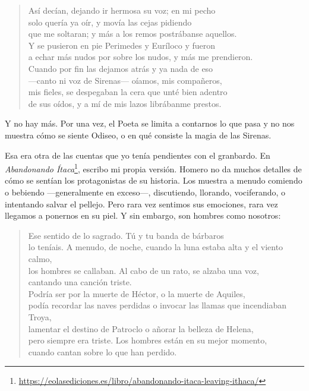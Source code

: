 \begin{verse}
Así decían, dejando ir hermosa su voz; en mi pecho\\
solo quería ya oír, y movía las cejas pidiendo\\
que me soltaran; y más a los remos postrábanse aquellos.\\
Y se pusieron en pie Perimedes y Euríloco y fueron\\
a echar más nudos por sobre los nudos, y más me prendieron.\\
Cuando por fin las dejamos atrás y ya nada de eso\\
---canto ni voz de Sirenas--- oíamos, mis compañeros,\\
mis fieles, se despegaban la cera que unté bien adentro\\
de sus oídos, y a mí de mis lazos librábanme prestos.
\end{verse}

Y no hay más. Por una vez, el Poeta se limita a contarnos lo que pasa y no nos muestra cómo se siente Odiseo, o en qué consiste la magia de las Sirenas.

Esa era otra de las cuentas que yo tenía pendientes con el granbardo. En \emph{Abandonando Ítaca}\footnote{\url{https://eolasediciones.es/libro/abandonando-itaca-leaving-ithaca/}}, escribo mi propia versión. Homero no da muchos detalles de cómo se sentían los protagonistas de su historia. Los muestra a menudo comiendo o bebiendo ---generalmente en exceso---, discutiendo, llorando, vociferando, o intentando salvar el pellejo. Pero rara vez sentimos sus emociones, rara vez llegamos a ponernos en su piel. Y sin embargo, son hombres como nosotros:

\begin{verse}
Ese sentido de lo sagrado. Tú y tu banda de bárbaros\\
lo teníais. A menudo, de noche, cuando la luna estaba alta y el viento calmo,\\
los hombres se callaban. Al cabo de un rato, se alzaba una voz,\\
cantando una canción triste.\\
Podría ser por la muerte de Héctor, o la muerte de Aquiles,\\
podía recordar las naves perdidas o invocar las llamas que incendiaban Troya,\\
lamentar el destino de Patroclo o añorar la belleza de Helena,\\
pero siempre era triste. Los hombres están en su mejor momento,\\
cuando cantan sobre lo que han perdido.
\end{verse}

